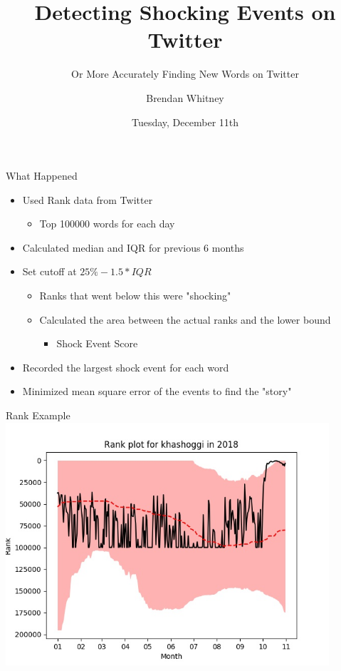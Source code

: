 \documentclass{beamer}
\title{Detecting Shocking Events on Twitter}
\subtitle{Or More Accurately Finding New Words on Twitter}
\author{Brendan Whitney}
\date{Tuesday, December 11th}
\begin{document}
\maketitle

\begin{frame}{What Happened}
    \begin{itemize}
        \item Used Rank data from Twitter
        \begin{itemize}
            \item Top 100000 words for each day
        \end{itemize}
        \item Calculated median and IQR for previous 6 months
        \item Set cutoff at $25\% - 1.5 * IQR$
        \begin{itemize}
            \item Ranks that went below this were "shocking"
            \item Calculated the area between the actual ranks and the lower bound
            \begin{itemize}
                \item Shock Event Score
            \end{itemize}
        \end{itemize}
        \item Recorded the largest shock event for each word
        \item Minimized mean square error of the events to find the "story"
    \end{itemize}
\end{frame}


\begin{frame}{Rank Example}
    \includegraphics[width=0.9\textwidth]{khashoggi-2018.jpg}
\end{frame}
\end{document}

